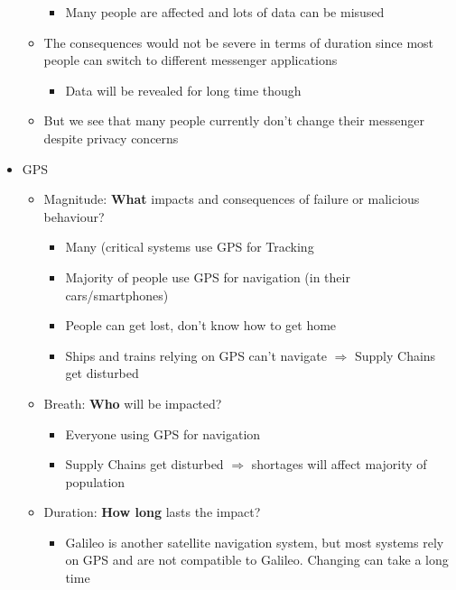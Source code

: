\documentclass{article}
\begin{document}
\begin{itemize}
\begin{itemize}
                    \begin{itemize}
                        \item Many people are affected and lots of data can be misused
                    \end{itemize}
              \item The consequences would not be severe in terms of duration since most people can switch to different messenger applications
                    \begin{itemize}
                        \item Data will be revealed for long time though
                    \end{itemize}
              \item But we see that many people currently don't change their messenger despite privacy concerns
          \end{itemize}
    \item GPS
          \begin{itemize}
              \item Magnitude: \textbf{What} impacts and consequences of failure or malicious behaviour?
                    \begin{itemize}
                        \item Many (critical systems use GPS for Tracking
                        \item Majority of people use GPS for navigation (in their cars/smartphones)
                        \item People can get lost, don't know how to get home
                        \item Ships and trains relying on GPS can't navigate \(\Rightarrow\) Supply Chains get disturbed
                    \end{itemize}
              \item Breath: \textbf{Who} will be impacted?
                    \begin{itemize}
                        \item Everyone using GPS for navigation
                        \item Supply Chains get disturbed \(\Rightarrow\) shortages will affect majority of population
                    \end{itemize}
              \item Duration: \textbf{How long} lasts the impact?
                    \begin{itemize}
                        \item Galileo is another satellite navigation system, but most systems rely on GPS and are not compatible to Galileo. Changing can take a long time

\end{itemize}
\end{itemize}
\end{itemize}
\end{document}
